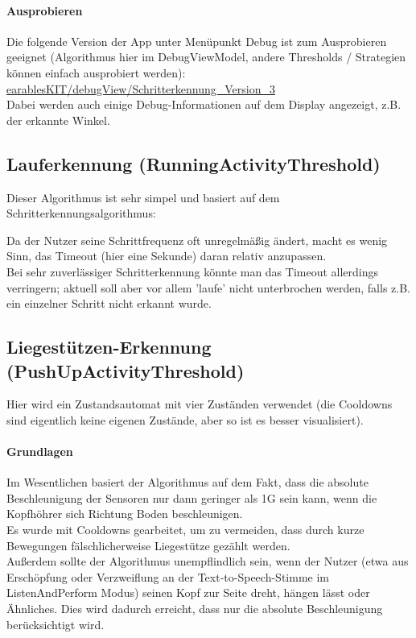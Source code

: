 \documentclass[a4paper,12pt]{article}
\begin{document}
\paragraph{Ausprobieren}
Die folgende Version der App unter Menüpunkt Debug ist zum Ausprobieren geeignet (Algorithmus hier im DebugViewModel, andere Thresholds / Strategien können einfach ausprobiert werden): 
\href{https://github.com/vlle1/earablesKIT/tree/b8b34bbe0716ddb37c5afbd315e91d7f11c0270d}{earablesKIT/debugView/Schritterkennung\_Version\_3}\\
Dabei werden auch einige Debug-Informationen auf dem Display angezeigt, z.B. der erkannte Winkel.

\subsection{Lauferkennung (RunningActivityThreshold)}
Dieser Algorithmus ist sehr simpel und basiert auf dem Schritterkennungsalgorithmus: 
\newline

Da der Nutzer seine Schrittfrequenz oft unregelmäßig ändert, macht es wenig Sinn, das Timeout (hier eine Sekunde) daran relativ anzupassen.\\
Bei sehr zuverlässiger Schritterkennung könnte man das Timeout allerdings verringern; aktuell soll aber vor allem 'laufe' nicht unterbrochen werden, falls z.B. ein einzelner Schritt nicht erkannt wurde.\\ 

\subsection{Liegestützen-Erkennung (PushUpActivityThreshold)}
Hier wird ein Zustandsautomat mit vier Zuständen verwendet (die Cooldowns sind eigentlich keine eigenen Zustände, aber so ist es besser visualisiert). 
\paragraph{Grundlagen}
Im Wesentlichen basiert der Algorithmus auf dem Fakt, dass die absolute Beschleunigung der Sensoren nur dann geringer als 1G sein kann, wenn die Kopfhöhrer sich Richtung Boden beschleunigen.\\
Es wurde mit Cooldowns gearbeitet, um zu vermeiden, dass durch kurze Bewegungen fälschlicherweise Liegestütze gezählt werden.\\
Außerdem sollte der Algorithmus unempflindlich sein, wenn der Nutzer (etwa aus Erschöpfung oder Verzweiflung an der Text-to-Speech-Stimme im ListenAndPerform Modus) seinen Kopf zur Seite dreht, hängen lässt oder Ähnliches. Dies wird dadurch erreicht, dass nur die absolute Beschleunigung berücksichtigt wird.
\end{document}
